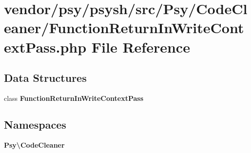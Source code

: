\section{vendor/psy/psysh/src/\+Psy/\+Code\+Cleaner/\+Function\+Return\+In\+Write\+Context\+Pass.php File Reference}
\label{_function_return_in_write_context_pass_8php}
\subsection*{Data Structures}
\begin{DoxyCompactItemize}
\item 
class {\bf Function\+Return\+In\+Write\+Context\+Pass}
\end{DoxyCompactItemize}
\subsection*{Namespaces}
\begin{DoxyCompactItemize}
\item 
 {\bf Psy\textbackslash{}\+Code\+Cleaner}
\end{DoxyCompactItemize}
